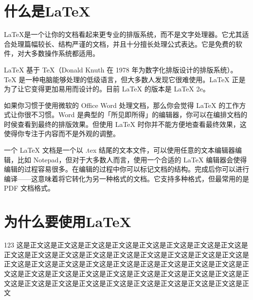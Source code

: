 \section{什么是LaTeX}
    \LaTeX{}是一个让你的文档看起来更专业的排版系统，而不是文字处理器。它尤其适合处理篇幅较长、结构严谨的文档，并且十分擅长处理公式表达。它是免费的软件，对大多数操作系统都适用。

    \LaTeX{} 基于 TeX（Donald Knuth 在 1978 年为数字化排版设计的排版系统）。TeX 是一种电脑能够处理的低级语言，但大多数人发现它很难使用。\LaTeX{} 正是为了让它变得更加易用而设计的。目前 \LaTeX{} 的版本是 \LaTeX{} 2e。

    如果你习惯于使用微软的 Office Word 处理文档，那么你会觉得 \LaTeX{} 的工作方式让你很不习惯。Word 是典型的「所见即所得」的编辑器，你可以在编排文档的时侯查看到最终的排版效果。但使用 \LaTeX{} 时你并不能方便地查看最终效果，这使得你专注于内容而不是外观的调整。

    一个 \LaTeX{} 文档是一个以 .tex 结尾的文本文件，可以使用任意的文本编辑器编辑，比如 Notepad，但对于大多数人而言，使用一个合适的 \LaTeX{} 编辑器会使得编辑的过程容易很多。在编辑的过程中你可以标记文档的结构。完成后你可以进行编译——这意味着将它转化为另一种格式的文档。它支持多种格式，但最常用的是 PDF 文档格式。\cite{latexTemplate}

\section{为什么要使用LaTeX}
    123
    这是正文这是正文这是正文这是正文这是正文这是正文这是正文这是正文这是正文这是正文这是正文这是正文这是正文这是正文这是正文这是正文这是正文这是正文这是正文这是正文这是正文这是正文这是正这是正文这是正文这是正文这是正文这是正文这是正文这是正文这是正文这是正文这是正文这是正文这是正文这是正文这是正文这是正文这是正文这是正文这是正文这是正文这是正文这是正文这是正文